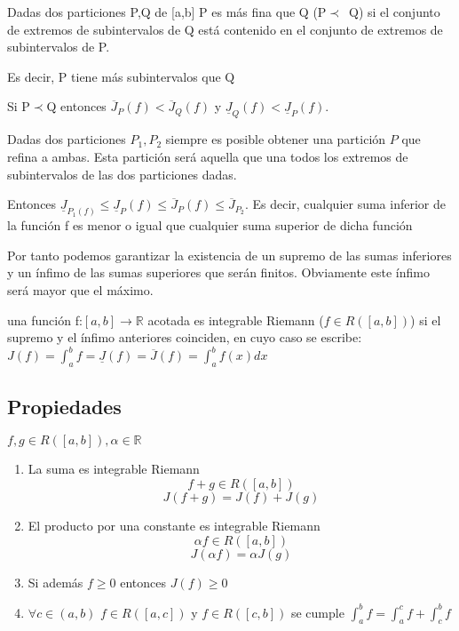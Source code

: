 \documentclass{apuntes}
\begin{document}
\begin{defn}[Finura]
Dadas dos particiones P,Q de [a,b] P es más fina que Q (P$\prec$~Q) si el conjunto de extremos de subintervalos de Q está contenido en el conjunto de extremos de subintervalos de P.

Es decir, P tiene más subintervalos que Q
\end{defn}

Si P$\prec$Q entonces $\overline{J}_P(f) < \overline{J}_Q(f)$  y $\underline{J}_Q(f) < \underline{J}_P(f)$.

Dadas dos particiones $P_1,P_2$ siempre es posible obtener una partición $P$ que refina a ambas. Esta partición será aquella que una todos los extremos de subintervalos de las dos particiones dadas.

Entonces $\underline{J}_{P_1(f)} \leq \underline{J}_P(f) \leq \overline{J}_P(f) \leq \overline{J}_{P_2}$. Es decir, cualquier suma inferior de la función f es menor o igual que cualquier suma superior de dicha función

Por tanto podemos garantizar la existencia de un supremo de las sumas inferiores y un ínfimo de las sumas superiores que serán finitos. Obviamente este ínfimo será mayor que el máximo.

\begin{defn}
una función f:$[ a,b] \rightarrow \mathbb{R}$ acotada es integrable Riemann ($f \in R([a,b])$) si el supremo y el ínfimo anteriores coinciden, en cuyo caso se escribe:
$J(f) = \int_a^b f = \underline{J}(f) = \overline{J}(f) = \int_a^b f(x) dx$
\end{defn}

\subsection{Propiedades}
$f,g \in R([a,b]), \alpha \in \mathbb{R}$
\begin{enumerate}
\item La suma es integrable Riemann
\[f + g \in R([a,b])\]\[ J(f+g) = J(f) + J(g)\]
\item El producto por una constante es integrable Riemann
\[\alpha f \in R([a,b])\] \[ J(\alpha f) = \alpha J(g)\]
\item Si además $f\geq 0$ entonces $J(f)\geq 0$
\item $\forall c \in (a,b)$ $f\in R([a,c])$  y $f\in R([c,b])$ se cumple
$\int_a^b f = \int_a^c f + \int_c^b f$
\end{enumerate}
\end{document}
